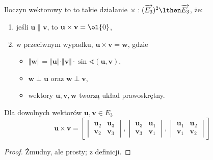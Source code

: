 \begin{definition}
    \label{d:cross product}
    Iloczyn wektorowy to to takie działanie $\times : (\overrightarrow{E_3})^2 \lthen \overrightarrow{E_3}$, że:
    \begin{enumerate}
        \item jeśli $\mathbf{u} \parallel \mathbf{v}$, to $\mathbf{u} \times \mathbf{v} = \ol{0}$,
        \item w przeciwnym wypadku, $\mathbf{u} \times \mathbf{v} = \mathbf{w}$, gdzie
            \begin{itemize}
                \item $\Vert\mathbf{w}\Vert = \Vert\mathbf{u}\Vert \cdot \Vert\mathbf{v}\Vert\cdot\sin\sphericalangle(\mathbf{u}, \mathbf{v})$,
                \item $\mathbf{w} \perp \mathbf{u}$ oraz $\mathbf{w} \perp \mathbf{v}$,
                \item wektory $\mathbf{u}, \mathbf{v}, \mathbf{w}$ tworzą układ prawoskrętny.
            \end{itemize}
    \end{enumerate}
\end{definition}


\begin{theorem}
    Dla dowolnych wektorów $\mathbf{u}, \mathbf{v} \in E_3$
    \[ \mathbf{u} \times \mathbf{v} = \left[\begin{vmatrix}
        \mathbf{u}_2 & \mathbf{u}_3 \\
        \mathbf{v}_2 & \mathbf{v}_3
    \end{vmatrix}, \begin{vmatrix}
        \mathbf{u}_3 & \mathbf{u}_1 \\
        \mathbf{v}_3 & \mathbf{v}_1
    \end{vmatrix}, \begin{vmatrix}
        \mathbf{u}_1 & \mathbf{u}_2 \\
        \mathbf{v}_1 & \mathbf{v}_2
    \end{vmatrix}\right]\]
\end{theorem}
\begin{proof}
    Żmudny, ale prosty; z definicji.
\end{proof}

